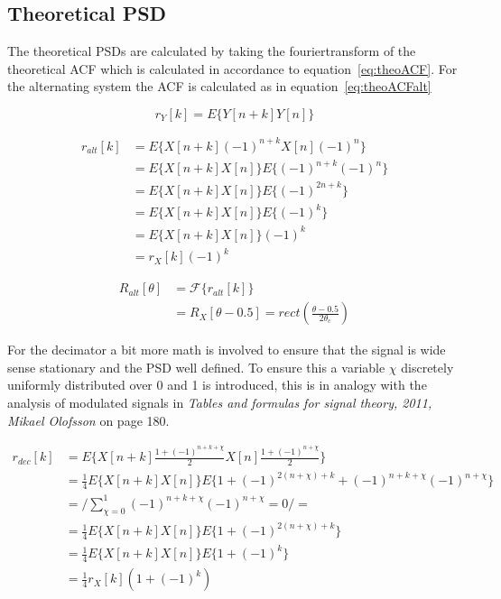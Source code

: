 \documentclass[10pt]{article}
\begin{document}
\subsection{Theoretical PSD}
The theoretical PSDs are calculated by taking the fouriertransform of the theoretical
ACF which is calculated in accordance to equation~\ref{eq:theoACF}.
For the alternating system the ACF is calculated as in equation~\ref{eq:theoACFalt}

\begin{equation}
  \label{eq:theoACF}
  r_Y[k] = E\{Y[n+k]Y[n]\}
\end{equation}

\begin{align}
  \label{eq:theoACFalt}
  r_{alt}[k] & = E\{X[n+k](-1)^{n+k}X[n](-1)^n\}\nonumber \\
  & =E\{X[n+k]X[n]\}E\{(-1)^{n+k}(-1)^n\}\nonumber \\
  & =E\{X[n+k]X[n]\}E\{(-1)^{2n+k}\}\nonumber \\
  & =E\{X[n+k]X[n]\}E\{(-1)^k\}\nonumber \\
  & =E\{X[n+k]X[n]\}(-1)^k\nonumber \\
  & =r_X[k](-1)^k
\end{align}

\begin{align}
  \label{eq:theoPSDalt}
  R_{alt}[\theta] & = \mathcal{F}\{r_{alt}[k]\} \nonumber \\
  & = R_X[\theta-0.5] = rect(\frac{\theta-0.5}{2\theta_c})
\end{align}

For the decimator a bit more math is involved to ensure that the signal is wide
sense stationary and the PSD well defined. To ensure this a variable $\chi$ discretely
uniformly distributed over 0 and 1 is introduced, this is in analogy with the analysis
 of modulated signals in \emph{Tables and formulas for signal theory,
 2011, Mikael Olofsson} on page 180.

\begin{align}
  \label{eq:theoACFdec}
  r_{dec}[k] & = E\{X[n+k]\frac{1+(-1)^{n+k+\chi}}{2}X[n]\frac{1+(-1)^{n+\chi}}{2}\}\nonumber \\
  & =\frac{1}{4}E\{X[n+k]X[n]\}E\{1+(-1)^{2(n+\chi)+k}+(-1)^{n+k+\chi}(-1)^{n+\chi}\}\nonumber \\
  & =\Bigg/ \sum_{\chi = 0}^1 (-1)^{n+k+\chi}(-1)^{n+\chi} = 0   \Bigg/ = \nonumber \\
  & =\frac{1}{4}E\{X[n+k]X[n]\}E\{1+(-1)^{2(n+\chi)+k}\}\nonumber \\
  & =\frac{1}{4}E\{X[n+k]X[n]\}E\{1+(-1)^k\}\nonumber \\
  & =\frac{1}{4}r_X[k](1+(-1)^k)
\end{align}
\end{document}
